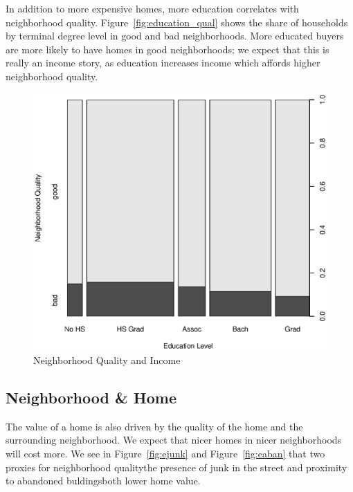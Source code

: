 \documentclass[11pt, fleqn]{article}
\begin{document}
In addition to more expensive homes, more education correlates with neighborhood quality. Figure~\vref{fig:education_qual} shows the share of households by terminal degree level in good and bad neighborhoods. More educated buyers are more likely to have homes in good neighborhoods; we expect that this is really an income story, as education increases income which affords higher neighborhood quality.

\begin{figure}[!htb]
  \centering
  \includegraphics[scale=.5]{neighborhood_quality_vs_education.eps}
  \caption{Neighborhood Quality and Income}
  \label{fig:education_qual}
\end{figure}

\subsection{Neighborhood \& Home}

The value of a home is also driven by the quality of the home and the surrounding neighborhood. We expect that nicer homes in nicer neighborhoods will cost more. We see in Figure~\vref{fig:ejunk} and Figure~\vref{fig:eaban} that two proxies for neighborhood quality\textemdash the presence of junk in the street and proximity to abandoned buldings\textemdash both lower home value. 
\end{document}
